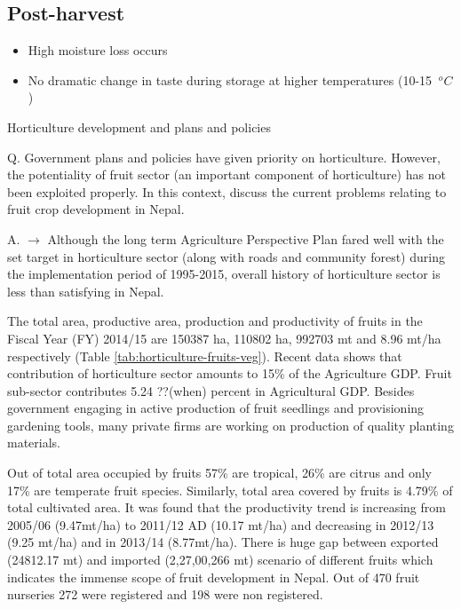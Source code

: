 \documentclass[
  openany]{book}
\providecommand{\tightlist}{%
  \setlength{\itemsep}{0pt}\setlength{\parskip}{0pt}}
\begin{document}
\hypertarget{post-harvest}{%
\subsection{Post-harvest}\label{post-harvest}}

\begin{itemize}
\tightlist
\item
  High moisture loss occurs
\item
  No dramatic change in taste during storage at higher temperatures (10-15 \(\ ^o C\))
\end{itemize}

Horticulture development and plans and policies

Q. Government plans and policies have given priority on horticulture. However, the potentiality of fruit sector (an important component of horticulture) has not been exploited properly. In this context, discuss the current problems relating to fruit crop development in Nepal.

A. \(\longrightarrow\) Although the long term Agriculture Perspective Plan fared well with the set target in horticulture sector (along with roads and community forest) during the implementation period of 1995-2015, overall history of horticulture sector is less than satisfying in Nepal.

The total area, productive area, production and productivity of fruits in the Fiscal Year (FY) 2014/15 are 150387 ha, 110802 ha, 992703 mt and 8.96 mt/ha respectively (Table \ref{tab:horticulture-fruits-veg}). Recent data shows that contribution of horticulture sector amounts to 15\% of the Agriculture GDP. Fruit sub-sector contributes 5.24 ??(when) percent in Agricultural GDP. Besides government engaging in active production of fruit seedlings and provisioning gardening tools, many private firms are working on production of quality planting materials.

Out of total area occupied by fruits 57\% are tropical, 26\% are citrus and only 17\% are temperate fruit species. Similarly, total area covered by fruits is 4.79\% of total cultivated area. It was found that the productivity trend is increasing from 2005/06 (9.47mt/ha) to 2011/12 AD (10.17 mt/ha) and decreasing in 2012/13 (9.25 mt/ha) and in 2013/14 (8.77mt/ha). There is huge gap between exported (24812.17 mt) and imported (2,27,00,266 mt) scenario of different fruits which indicates the immense scope of fruit development in Nepal. Out of 470 fruit nurseries 272 were registered and 198 were non registered.
\end{document}
